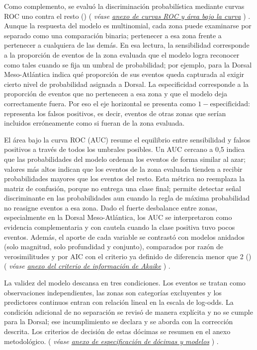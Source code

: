 \documentclass[
  spanish,
  letterpaper,
  DIV=11,
  numbers=noendperiod]{scrartcl}
\newcommand{\asesoriaParenRef}[1]{%
  \textnormal{\textcolor{asesoriaTextColor}{(}}%
  {\hypersetup{linkcolor=asesoriaLinkColor,urlcolor=asesoriaLinkColor,citecolor=asesoriaLinkColor}\textcolor{asesoriaTextColor}{\emph{#1}}}%
  \textnormal{\textcolor{asesoriaTextColor}{)}}%
}
\begin{document}
Como complemento, se evaluó la discriminación probabilística mediante
curvas ROC uno contra el resto ()
\asesoriaParenRef{véase \hyperref[sec-anexo-roc]{anexo de curvas ROC y área bajo la curva}}.
Aunque la respuesta del modelo es multinomial, cada zona puede
examinarse por separado como una comparación binaria; pertenecer a esa
zona frente a pertenecer a cualquiera de las demás. En esa lectura, la
sensibilidad corresponde a la proporción de eventos de la zona evaluada
que el modelo logra reconocer como tales cuando se fija un umbral de
probabilidad; por ejemplo, para la Dorsal Meso-Atlántica indica qué
proporción de sus eventos queda capturada al exigir cierto nivel de
probabilidad asignada a Dorsal. La especificidad corresponde a la
proporción de eventos que no pertenecen a esa zona y que el modelo deja
correctamente fuera. Por eso el eje horizontal se presenta como
\(1-\text{especificidad}\): representa los falsos positivos, es decir,
eventos de otras zonas que serían incluidos erróneamente como si fueran
de la zona evaluada.

El área bajo la curva ROC (AUC) resume el equilibrio entre sensibilidad
y falsos positivos a través de todos los umbrales posibles. Un AUC
cercano a 0,5 indica que las probabilidades del modelo ordenan los
eventos de forma similar al azar; valores más altos indican que los
eventos de la zona evaluada tienden a recibir probabilidades mayores que
los eventos del resto. Esta métrica no reemplaza la matriz de confusión,
porque no entrega una clase final; permite detectar señal discriminante
en las probabilidades aun cuando la regla de máxima probabilidad no
reasigne eventos a esa zona. Dado el fuerte desbalance entre zonas,
especialmente en la Dorsal Meso-Atlántica, los AUC se interpretaron como
evidencia complementaria y con cautela cuando la clase positiva tuvo
pocos eventos. Además, el aporte de cada variable se contrastó con
modelos anidados (solo magnitud, solo profundidad y conjunto),
comparados por razón de verosimilitudes y por AIC con el criterio ya
definido de diferencia menor que 2
()
\asesoriaParenRef{véase \hyperref[sec-anexo-aic]{anexo del criterio de información de Akaike}}.

La validez del modelo descansa en tres condiciones. Los eventos se
tratan como observaciones independientes, las zonas son categorías
excluyentes y los predictores continuos entran con relación lineal en la
escala de log-odds. La condición adicional de no separación se revisó de
manera explícita y no se cumple para la Dorsal; ese incumplimiento se
declara y se aborda con la corrección descrita. Los criterios de
decisión de estas dócimas se resumen en el anexo metodológico.
\asesoriaParenRef{véase \hyperref[sec-anexo-especificacion]{anexo de especificación de dócimas y modelos}}.
\end{document}
